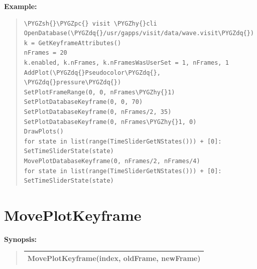 \documentclass[letterpaper,10pt,english]{sphinxmanual}
\def\PYGZsh{\char`\#}
\def\PYGZpc{\char`\%}
\def\PYGZhy{\char`\-}
\def\PYGZdq{\char`\"}
\begin{document}
\begin{DUlineblock}{0em}
\item[] \textbf{Example:}
\item[] 
\end{DUlineblock}
\begin{quote}

\begin{Verbatim}[commandchars=\\\{\}]
\PYGZsh{}\PYGZpc{} visit \PYGZhy{}cli
OpenDatabase(\PYGZdq{}/usr/gapps/visit/data/wave.visit\PYGZdq{})
k = GetKeyframeAttributes()
nFrames = 20
k.enabled, k.nFrames, k.nFramesWasUserSet = 1, nFrames, 1
AddPlot(\PYGZdq{}Pseudocolor\PYGZdq{}, \PYGZdq{}pressure\PYGZdq{})
SetPlotFrameRange(0, 0, nFrames\PYGZhy{}1)
SetPlotDatabaseKeyframe(0, 0, 70)
SetPlotDatabaseKeyframe(0, nFrames/2, 35)
SetPlotDatabaseKeyframe(0, nFrames\PYGZhy{}1, 0)
DrawPlots()
for state in list(range(TimeSliderGetNStates())) + [0]:
SetTimeSliderState(state)
MovePlotDatabaseKeyframe(0, nFrames/2, nFrames/4)
for state in list(range(TimeSliderGetNStates())) + [0]:
SetTimeSliderState(state)
\end{Verbatim}
\end{quote}


\section{MovePlotKeyframe}
\label{functions:moveplotkeyframe}
\begin{DUlineblock}{0em}
\item[] \textbf{Synopsis:}
\end{DUlineblock}
\begin{quote}

\begin{tabulary}{\linewidth}{|L|}
\hline

MovePlotKeyframe(index, oldFrame, newFrame)
\\
\hline\end{tabulary}

\end{quote}
\end{document}
